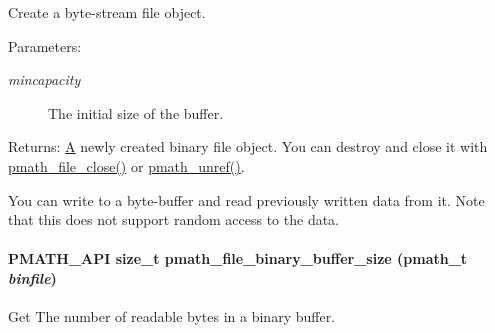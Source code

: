 Create a byte-stream file object. 

\begin{Desc}
\item[Parameters:]
\begin{description}
\item[{\em mincapacity}]The initial size of the buffer. \end{description}
\end{Desc}
\begin{Desc}
\item[Returns:]\hyperlink{class_a}{A} newly created binary file object. You can destroy and close it with \hyperlink{group__file__api_g61142920bd7a8f066af908092c84d8e4}{pmath\_\-file\_\-close()} or \hyperlink{classpmath__t_54e905402c38940687033b87eb8c6c9f}{pmath\_\-unref()}.\end{Desc}
You can write to a byte-buffer and read previously written data from it. Note that this does not support random access to the data. \hypertarget{group__file__api_gaa064ada946d36bf41ed9908d8176360}{
\paragraph[{pmath\_\-file\_\-binary\_\-buffer\_\-size}]{\setlength{\rightskip}{0pt plus 5cm}PMATH\_\-API size\_\-t pmath\_\-file\_\-binary\_\-buffer\_\-size ({\bf pmath\_\-t} {\em binfile})}\hfill}
\label{group__file__api_gaa064ada946d36bf41ed9908d8176360}


Get The number of readable bytes in a binary buffer. 

